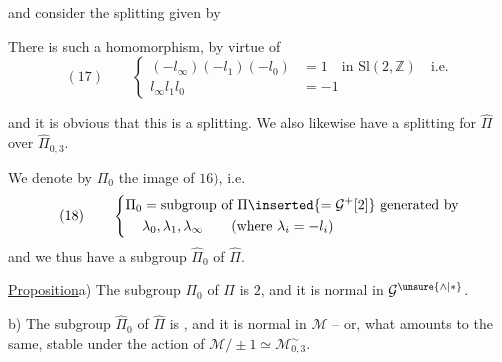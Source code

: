 

and consider the splitting given by


There  is such a homomorphism, by virtue of
\[
(17)\qquad
\left\{\begin{aligned}
(-l_\infty)(-l_1)(-l_0)&=1\quad\text{in }\mathrm{Sl}(2,\mathbb Z)\quad\text{i.e.}\\
l_\infty l_1l_0&=-1
\end{aligned}\right.
\]
\margin{$)$}

and it is obvious that this is a splitting. We also likewise have a splitting for $\widehat\Pi$ over $\widehat\Pi_{0,3}$.

We denote by $\Pi_0$ the image of $16)$, i.e.
\[
(18)\qquad
\left\{\begin{aligned}
\Pi_0&=\text{subgroup of }\Pi\inserted{=\mathcal{G}^{+}[2]}\text{ generated by}\\
&\lambda_0,\lambda_1,\lambda_\infty\qquad(\text{where }\lambda_i=-l_i)
\end{aligned}\right.
\]
and we thus have a subgroup $\widehat\Pi_0$ of $\widehat\Pi$.

\uline{Proposition}\quad a) The subgroup $\Pi_0$ of $\Pi$ is  $2$, and it is normal in $\mathcal{G}^{\unsure{\wedge|*}}$.

b) The subgroup $\widehat\Pi_0$ of $\widehat\Pi$ is , and it is normal in $\mathcal M$ -- or, what amounts to the same, stable under the action of $\mathcal M/\pm1\simeq\mathcal M_{0,3}^{\sim}$.

